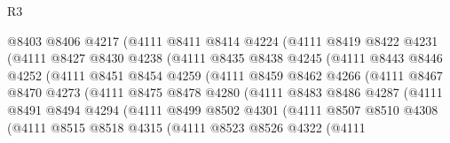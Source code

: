 \begin{lexlean}{R3}
\begin{coremodule}
                    @8403
                    @8406
                    @4217
                    (@4111
                      @8411
                      @8414
                      @4224
                      (@4111
                        @8419
                        @8422
                        @4231
                        (@4111
                          @8427
                          @8430
                          @4238
                          (@4111
                            @8435
                            @8438
                            @4245
                            (@4111
                              @8443
                              @8446
                              @4252
                              (@4111
                                @8451
                                @8454
                                @4259
                                (@4111
                                  @8459
                                  @8462
                                  @4266
                                  (@4111
                                    @8467
                                    @8470
                                    @4273
                                    (@4111
                                      @8475
                                      @8478
                                      @4280
                                      (@4111
                                        @8483
                                        @8486
                                        @4287
                                        (@4111
                                          @8491
                                          @8494
                                          @4294
                                          (@4111
                                            @8499
                                            @8502
                                            @4301
                                            (@4111
                                              @8507
                                              @8510
                                              @4308
                                              (@4111
                                                @8515
                                                @8518
                                                @4315
                                                (@4111
                                                  @8523
                                                  @8526
                                                  @4322
                                                  (@4111

\end{coremodule}
\end{lexlean}
